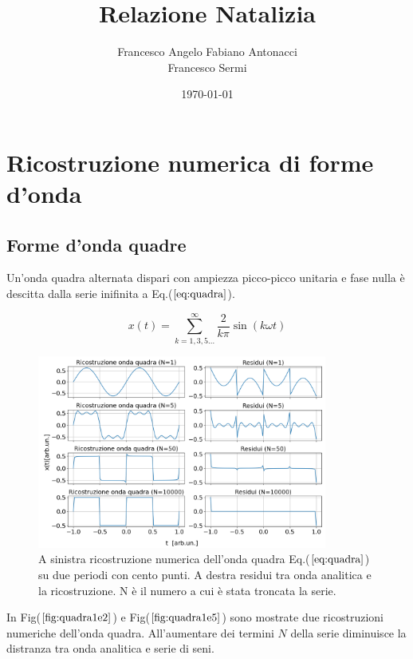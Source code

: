 \documentclass{article}
\author{Francesco Angelo Fabiano Antonacci\\Francesco Sermi}
\date{\today}
\title{Relazione Natalizia}
\begin{document}
\maketitle

\section{Ricostruzione numerica di forme d'onda}
    \subsection{Forme d'onda quadre}
    \label{sez:quadra}
        Un'onda quadra alternata dispari con ampiezza picco-picco unitaria e fase 
        nulla è descitta dalla serie inifinita a Eq.($\ref{eq:quadra}$).

        \begin{equation}
            x(t) = \sum_{k=1,3,5...}^{\infty} \frac{2}{k\pi}\sin\left(k\omega t\right)
            \label{eq:quadra}
        \end{equation}


        \begin{figure}[htbp]
            \centering
            \includegraphics[width=0.85\textwidth]{fousquarewave1e2.png} %
            \caption{A sinistra ricostruzione numerica dell'onda quadra Eq.($\ref{eq:quadra}$) su
                    due periodi con cento punti.
                    A destra residui tra onda analitica e la ricostruzione.
                    N è il numero a cui è stata troncata la serie.}
            \label{fig:quadra1e2}
        \end{figure}

        \noindent In Fig($\ref{fig:quadra1e2}$) e Fig($\ref{fig:quadra1e5}$) sono mostrate due ricostruzioni
        numeriche dell'onda quadra.
        All'aumentare dei termini $N$ della serie diminuisce la distranza tra onda analitica e serie 
        di seni.
\end{document}

